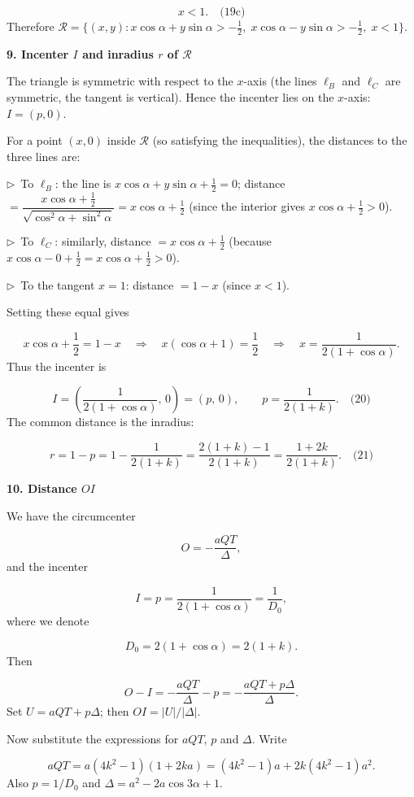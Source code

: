 \documentclass{llmxive}
\providecommand{\solutionheading}[1]{\par\smallskip\noindent\textbf{#1}\par}
\providecommand{\compactbullet}[1]{\par\noindent$\triangleright$~#1\par}
\begin{document}
\[
x < 1. \quad\text{(19c)}
\]
Therefore \(\mathcal{R} = \bigl\{(x,y) : x\cos\alpha + y\sin\alpha > -\frac12,\; x\cos\alpha - y\sin\alpha > -\frac12,\; x < 1 \bigr\}\).\par
\smallskip
\solutionheading{9. Incenter \(I\) and inradius \(r\) of \(\mathcal{R}\)}
The triangle is symmetric with respect to the \(x\)-axis (the lines \(\ell_B\) and \(\ell_C\) are symmetric, the tangent is vertical). Hence the incenter lies on the \(x\)-axis: \(I = (p,0)\).\par
For a point \((x,0)\) inside \(\mathcal{R}\) (so satisfying the inequalities), the distances to the three lines are:\par
\compactbullet{To \(\ell_B\): the line is \(x\cos\alpha + y\sin\alpha + \frac12 = 0\); distance \(= \dfrac{x\cos\alpha + \frac12}{\sqrt{\cos^2\alpha+\sin^2\alpha}} = x\cos\alpha + \frac12\) (since the interior gives \(x\cos\alpha + \frac12 > 0\)).}
\compactbullet{To \(\ell_C\): similarly, distance \(= x\cos\alpha + \frac12\) (because \(x\cos\alpha - 0 + \frac12 = x\cos\alpha + \frac12 > 0\)).}
\compactbullet{To the tangent \(x=1\): distance \(= 1 - x\) (since \(x<1\)).}
Setting these equal gives\par
\[
x\cos\alpha + \frac12 = 1 - x \quad\Longrightarrow\quad x(\cos\alpha + 1) = \frac12 \quad\Longrightarrow\quad x = \frac{1}{2(1+\cos\alpha)}.
\]
Thus the incenter is\par
\[
I = \left( \frac{1}{2(1+\cos\alpha)},\, 0 \right) = (p,\,0), \qquad p = \frac{1}{2(1+k)}. \quad\text{(20)}
\]
The common distance is the inradius:\par
\[
r = 1 - p = 1 - \frac{1}{2(1+k)} = \frac{2(1+k)-1}{2(1+k)} = \frac{1+2k}{2(1+k)}. \quad\text{(21)}
\]
\smallskip
\solutionheading{10. Distance \(OI\)}
We have the circumcenter\par
\[
O = -\frac{a Q T}{\Delta},
\]
and the incenter\par
\[
I = p = \frac{1}{2(1+\cos\alpha)} = \frac{1}{D_0},
\]
where we denote\par
\[
D_0 = 2(1+\cos\alpha) = 2(1+k).
\]
Then\par
\[
O - I = -\frac{a Q T}{\Delta} - p = -\frac{a Q T + p \Delta}{\Delta}.
\]
Set \(U = a Q T + p \Delta\); then \(OI = |U|/|\Delta|\).\par
Now substitute the expressions for \(a Q T\), \(p\) and \(\Delta\). Write\par
\[
a Q T = a(4k^2-1)(1+2k a) = (4k^2-1)a + 2k(4k^2-1)a^2.
\]
Also \(p = 1/D_0\) and \(\Delta = a^2 - 2a\cos3\alpha + 1\).\par
\end{document}
